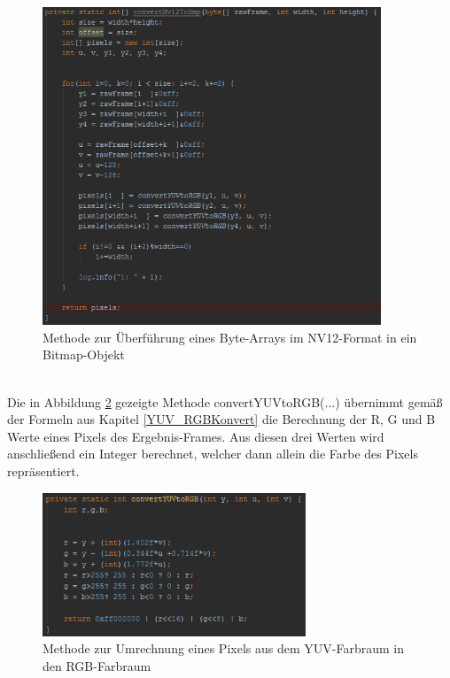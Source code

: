 \begin{figure}[h]
	\centering
	\includegraphics[width=0.9\textwidth]{Bilder/Bildverarbeitung/NV12_to_BMP.PNG}
	\caption{Methode zur Überführung eines Byte-Arrays im NV12-Format in ein Bitmap-Objekt}
	\label{fig:NV12_to_BMP}
\end{figure}

~\\
Die in Abbildung \ref{fig:YUV_to_RGB} gezeigte Methode convertYUVtoRGB(...) übernimmt gemäß der Formeln aus Kapitel \ref{YUV_RGBKonvert} die Berechnung der R, G und B Werte eines Pixels des Ergebnis-Frames. Aus diesen drei Werten wird anschließend ein Integer berechnet, welcher dann allein die Farbe des Pixels repräsentiert.
\clearpage
\begin{figure}[h]
	\centering
	\includegraphics[width=0.7\textwidth]{Bilder/Bildverarbeitung/convert_1_Pixel.PNG}
	\caption{Methode zur Umrechnung eines Pixels aus dem YUV-Farbraum in den RGB-Farbraum}
	\label{fig:YUV_to_RGB}
\end{figure}

